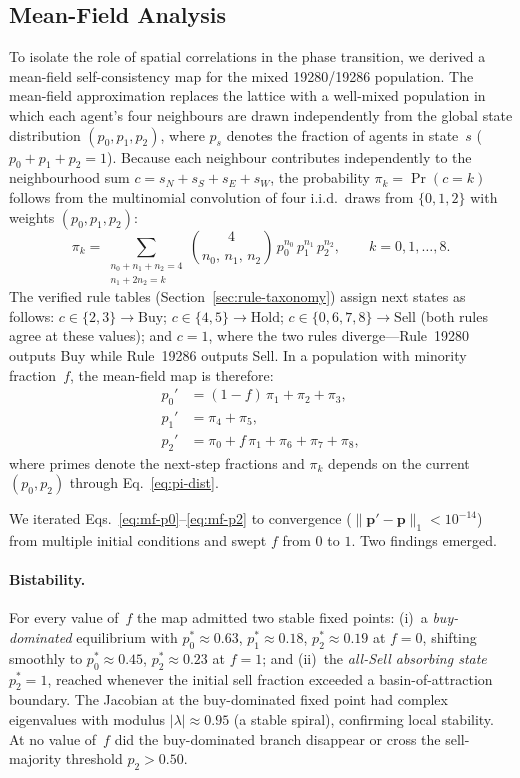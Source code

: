 \documentclass{article}
\theoremstyle{definition}
\theoremstyle{remark}
\begin{document}
\subsection{Mean-Field Analysis}
\label{sec:mean-field}

To isolate the role of spatial correlations in the phase transition, we derived a
mean-field self-consistency map for the mixed 19280/19286 population. The mean-field
approximation replaces the lattice with a well-mixed population in which each agent's
four neighbours are drawn independently from the global state distribution
$(p_0, p_1, p_2)$, where $p_s$ denotes the fraction of agents in state~$s$
($p_0 + p_1 + p_2 = 1$). Because each neighbour contributes independently to the
neighbourhood sum $c = s_N + s_S + s_E + s_W$, the probability $\pi_k = \Pr(c = k)$
follows from the multinomial convolution of four i.i.d.\ draws from
$\{0,1,2\}$ with weights $(p_0, p_1, p_2)$:
\begin{equation}
  \pi_k = \!\!\sum_{\substack{n_0+n_1+n_2=4 \\ n_1+2n_2=k}}\!\!
  \binom{4}{n_0,\,n_1,\,n_2}\,p_0^{n_0}\,p_1^{n_1}\,p_2^{n_2},
  \qquad k = 0,1,\ldots,8.
  \label{eq:pi-dist}
\end{equation}
The verified rule tables (Section~\ref{sec:rule-taxonomy}) assign next states as
follows: $c \in \{2,3\} \to \text{Buy}$; $c \in \{4,5\} \to \text{Hold}$;
$c \in \{0,6,7,8\} \to \text{Sell}$ (both rules agree at these values); and $c = 1$,
where the two rules diverge---Rule~19280 outputs Buy while Rule~19286 outputs Sell.
In a population with minority fraction~$f$, the mean-field map is therefore:
\begin{align}
  p_0' &= (1-f)\,\pi_1 + \pi_2 + \pi_3, \label{eq:mf-p0} \\
  p_1' &= \pi_4 + \pi_5, \label{eq:mf-p1} \\
  p_2' &= \pi_0 + f\,\pi_1 + \pi_6 + \pi_7 + \pi_8, \label{eq:mf-p2}
\end{align}
where primes denote the next-step fractions and $\pi_k$ depends on the current
$(p_0, p_2)$ through Eq.~\eqref{eq:pi-dist}.

We iterated Eqs.~\eqref{eq:mf-p0}--\eqref{eq:mf-p2} to convergence
($\lVert\mathbf{p}' - \mathbf{p}\rVert_1 < 10^{-14}$) from multiple initial
conditions and swept $f$ from $0$ to $1$. Two findings emerged.

\paragraph{Bistability.}
For every value of~$f$ the map admitted two stable fixed points: (i)~a
\emph{buy-dominated} equilibrium with $p_0^* \approx 0.63$,
$p_1^* \approx 0.18$, $p_2^* \approx 0.19$ at $f = 0$, shifting smoothly to
$p_0^* \approx 0.45$, $p_2^* \approx 0.23$ at $f = 1$; and
(ii)~the \emph{all-Sell absorbing state} $p_2^* = 1$, reached whenever the
initial sell fraction exceeded a basin-of-attraction boundary. The Jacobian at the
buy-dominated fixed point had complex eigenvalues with modulus $|\lambda| \approx 0.95$
(a stable spiral), confirming local stability. At no value of~$f$ did the buy-dominated
branch disappear or cross the sell-majority threshold $p_2 > 0.50$.
\end{document}
